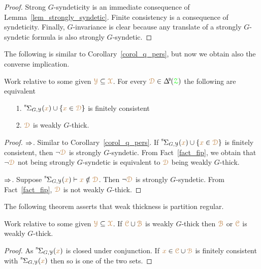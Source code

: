 \begin{proof}
  Strong $G$-syndeticity is an immediate consequence of Lemma~\ref{lem_strongly_syndetic}.
  Finite consistency is a consequence of syndeticity.
  Finally, $G$-invariance is clear because any translate of a strongly $G$-syndetic formula is also strongly $G$-syndetic.
\end{proof}

The following is similar to Corollary~\ref{corol_q_pers}, but now we obtain also the converse implication.

\begin{corollary}\label{corol_q_w_pers}
  Work relative to some given ${\color{brown}\EuScript Y}\subseteq{\color{brown}\EuScript X}$.
  For every $\mrD\in\BDelta(\grZ)$ the following are equivalent
  \begin{itemize}
    \item [1.] ${\mathstrut}^{\rm s}\kern-.1ex\Sigma_{G,\EuScript Y}({\color{brown} x})\cup\{{\color{brown} x}\in{\color{brown}\EuScript D}\}$ is finitely consistent
    \item [2.] ${\color{brown}\EuScript D}$ is weakly $G$-thick.
  \end{itemize}
\end{corollary}

\begin{proof}
  $\Rightarrow$. 
  Similar to Corollary~\ref{corol_q_pers}.
  If ${\mathstrut}^{\rm s}\kern-.1ex\Sigma_{G,\EuScript Y}({\color{brown} x})\cup\{{\color{brown} x}\in{\color{brown}\EuScript D}\}$ is finitely consistent, then $\neg{\color{brown}\EuScript D}$ is strongly $G$-syndetic.
  From Fact~\ref{fact_fip}, we obtain that $\neg{\color{brown}\EuScript D}$ not being strongly $G$-syndetic is equivalent to ${\color{brown}\EuScript D}$ being weakly $G$-thick.

  $\Rightarrow$.
  Suppose ${\mathstrut}^{\rm s}\kern-.1ex\Sigma_{G,\EuScript Y}({\color{brown} x})\vdash{\color{brown}x}\notin{\color{brown}\EuScript D}$.
  Then $\neg{\color{brown}\EuScript D}$ is strongly $G$-syndetic.
  From Fact~\ref{fact_fip}, ${\color{brown}\EuScript D}$ is not weakly $G$-thick.
\end{proof}

The following theorem asserts that weak thickness is partition regular.

\begin{theorem}\label{thm_wt_partreg}
  Work relative to some given ${\color{brown}\EuScript Y}\subseteq{\color{brown}\EuScript X}$.
  If ${\color{brown}\EuScript C}\cup{\color{brown}\EuScript B}$ is weakly $G$-thick then ${\color{brown}\EuScript B}$ or ${\color{brown}\EuScript C}$ is weakly $G$-thick.
\end{theorem}

\begin{proof}
  As ${\mathstrut}^{\rm s}\kern-.1ex\Sigma_{G,\EuScript Y}({\color{brown} x})$ is closed under conjunction.
  If ${\color{brown} x}\in {\color{brown}\EuScript C}\cup{\color{brown}\EuScript B}$ is finitely consistent with ${\mathstrut}^{\rm s}\kern-.1ex\Sigma_{G,\EuScript Y}({\color{brown} x})$ then so is one of the two sets.
\end{proof}

